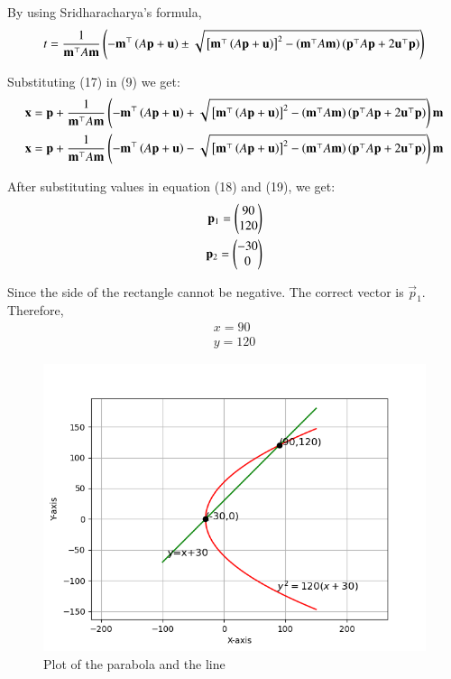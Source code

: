 \documentclass[journal]{IEEEtran}
\begin{document}
By using Sridharacharya's formula,
\begin{align}
    t=\frac{1}{\mathbf{m}^\top A\mathbf{m}}\left(-\mathbf{m}^\top\left(A\mathbf{p}+\mathbf{u}\right)\pm\sqrt{{}\left[\mathbf{m}^\top\left(A\mathbf{p}+\mathbf{u}\right)\right]^2-\left(\mathbf{m}^\top A\mathbf{m}\right)\left(\mathbf{p}^\top A\mathbf{p}+2\mathbf{u}^\top\mathbf{p}\right)}\right)
\end{align}

Substituting (17) in (9) we get:
\begin{align}
    \mathbf{x}= \mathbf{p}+\frac{1}{\mathbf{m}^\top A\mathbf{m}}\left(-\mathbf{m}^\top\left(A\mathbf{p}+\mathbf{u}\right)+\sqrt{{}\left[\mathbf{m}^\top\left(A\mathbf{p}+\mathbf{u}\right)\right]^2-\left(\mathbf{m}^\top A\mathbf{m}\right)\left(\mathbf{p}^\top A\mathbf{p}+2\mathbf{u}^\top\mathbf{p}\right)}\right)\mathbf{m}\\
    \mathbf{x}= \mathbf{p}+\frac{1}{\mathbf{m}^\top A\mathbf{m}}\left(-\mathbf{m}^\top\left(A\mathbf{p}+\mathbf{u}\right)-\sqrt{{}\left[\mathbf{m}^\top\left(A\mathbf{p}+\mathbf{u}\right)\right]^2-\left(\mathbf{m}^\top A\mathbf{m}\right)\left(\mathbf{p}^\top A\mathbf{p}+2\mathbf{u}^\top\mathbf{p}\right)}\right)\mathbf{m}
\end{align}

After substituting values in equation (18) and (19), we get:
\begin{align}
    \mathbf{p}_1 = \begin{pmatrix}90\\120\end{pmatrix}\\
    \mathbf{p}_2 = \begin{pmatrix}-30\\0\end{pmatrix}
\end{align}

Since the side of the rectangle cannot be negative. The correct vector is $\vec{p}_1$.\\ Therefore,
\begin{align}
    x = 90\\
    y = 120
\end{align}

\begin{figure}[h!]
   \centering
   \includegraphics[width=0.7\linewidth]{figs/plot.png}
   \caption{Plot of the parabola and the line}
   \label{}
\end{figure}
\end{document}
